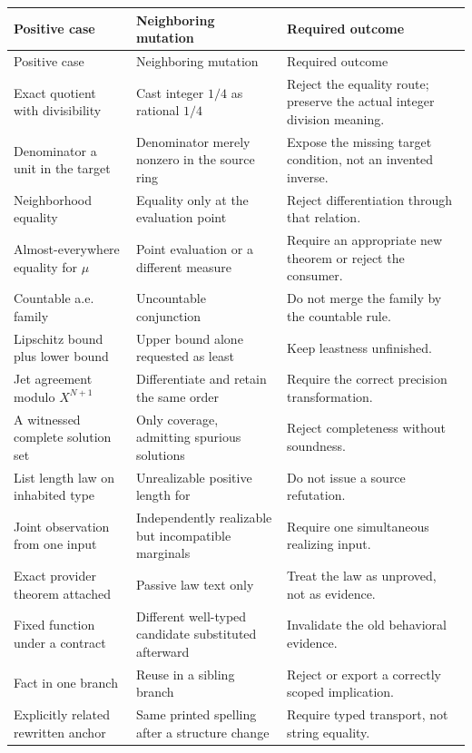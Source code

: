 \documentclass[11pt,a4paper]{article}
\newcommand{\code}[1]{\texttt{\detokenize{#1}}}
\theoremstyle{definition}
\theoremstyle{remark}
\begin{document}
{\small
\begin{longtable}{@{}P{.26\textwidth}P{.32\textwidth}P{.35\textwidth}@{}}
\toprule Positive case & Neighboring mutation & Required outcome\\\midrule
\endfirsthead
\toprule Positive case & Neighboring mutation & Required outcome\\\midrule
\endhead
\bottomrule\endfoot
Exact quotient with divisibility & Cast integer $1/4$ as rational $1/4$ & Reject the equality route; preserve the actual integer division meaning.\\
Denominator a unit in the target & Denominator merely nonzero in the source ring & Expose the missing target condition, not an invented inverse.\\
Neighborhood equality & Equality only at the evaluation point & Reject differentiation through that relation.\\
Almost-everywhere equality for $\mu$ & Point evaluation or a different measure & Require an appropriate new theorem or reject the consumer.\\
Countable a.e. family & Uncountable conjunction & Do not merge the family by the countable rule.\\
Lipschitz bound plus lower bound & Upper bound alone requested as least & Keep leastness unfinished.\\
Jet agreement modulo $X^{N+1}$ & Differentiate and retain the same order & Require the correct precision transformation.\\
A witnessed complete solution set & Only coverage, admitting spurious solutions & Reject completeness without soundness.\\
List length law on inhabited type & Unrealizable positive length for \code{List Empty} & Do not issue a source refutation.\\
Joint observation from one input & Independently realizable but incompatible marginals & Require one simultaneous realizing input.\\
Exact provider theorem attached & Passive law text only & Treat the law as unproved, not as evidence.\\
Fixed function under a contract & Different well-typed candidate substituted afterward & Invalidate the old behavioral evidence.\\
Fact in one branch & Reuse in a sibling branch & Reject or export a correctly scoped implication.\\
Explicitly related rewritten anchor & Same printed spelling after a structure change & Require typed transport, not string equality.\\

\end{longtable}}
\end{document}
